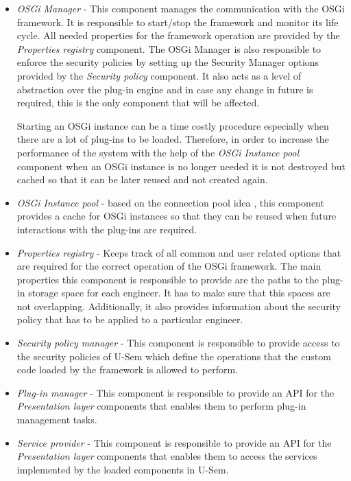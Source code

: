 \begin{itemize}

\item \textit{OSGi Manager} - This component manages the communication with the OSGi framework. It is responsible to start/stop the framework and monitor its life cycle. All needed properties for the framework operation are provided by the \textit{Properties registry} component. The OSGi Manager is also responsible to enforce the security policies by setting up the Security Manager options provided by the \textit{Security policy} component. It also acts as a level of abstraction over the plug-in engine and in case any change in future is required, this is the only component that will be affected. 

Starting an OSGi instance can be a time costly procedure especially when there are a lot of plug-ins to be loaded. Therefore, in order to increase the performance of the system with the help of the \textit{OSGi Instance pool} component when an OSGi instance is no longer needed it is not destroyed but cached so that it can be later reused and not created again.

\item \textit{OSGi Instance pool} - based on the connection pool idea \cite{zhao2004design}, this component provides a cache for OSGi instances so that they can be reused when future interactions with the plug-ins are required.

\item \textit{Properties registry} - Keeps track of all common and user related options that are required for the correct operation of the OSGi framework. The main properties this component is responsible to provide are the paths to the plug-in storage space for each engineer. It has to make sure that this spaces are not overlapping. Additionally, it also provides information about the security policy that has to be applied to a particular engineer. 

\item \textit{Security policy manager} - This component is responsible to provide access to the security policies of U-Sem which define the operations that the custom code loaded by the framework is allowed to perform.

\item \textit{Plug-in manager} - This component is responsible to provide an API for the \textit{Presentation layer} components that enables them to perform plug-in management tasks.

\item \textit{Service provider} - This component is responsible to provide an API for the \textit{Presentation layer} components that enables them to access the services implemented by the loaded components in U-Sem.

\end{itemize}

